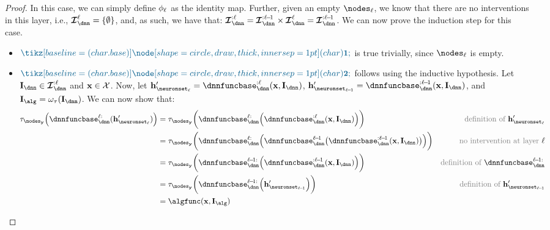 \begin{proof}
    In this case, we can simply define $\phi_\ell$ as the identity map.
    Further, given an empty $\nodes_\layer$, we know that there are no interventions in this layer, i.e., $\interventionsset^{\layer}_{\dnn} = \{\emptyintervention\}$, and, as such, we have that:
    $\interventionsset^{:\layer}_{\dnn} = \interventionsset^{:\layer\!-\!1}_{\dnn} \times \interventionsset^{\layer}_{\dnn} = \interventionsset^{:\layer\!-\!1}_{\dnn}$.
    We can now prove the induction step for this case.
    \begin{itemize}
        \item $\inductioncircle{1}$ is true trivially, since  $\nodes_\layer$ is empty.
        \item $\inductioncircle{2}$ follows using the inductive hypothesis. 
        Let $\interventionsdnn \in \interventionsset^{:\layer}_{\dnn}$ and $\mathbf{x} \in \mathcal{X}$.
        Now, let $\hiddenstates'_{\neuronset_{\layer}} = \dnnfunclayer{:\layer}(\bx, \interventionsdnn)$, $\hiddenstates'_{\neuronset_{\layer\!-\!1}} = \dnnfunclayer{:\layer\!-\!1}(\bx, \interventionsdnn)$, and $\interventionsalg = \interventionmap(\interventionsdnn)$.
        We can now show that:
        \begin{subequations}
            \begin{align}
                \abstractionmap_{\nodesoutput}\Big(\dnnfunclayer{\layer:}(\hiddenstates'_{\neuronset_{\layer}})\Big) 
                &= \abstractionmap_{\nodesoutput}\bigg(\dnnfunclayer{\layer:}\Big(\dnnfunclayer{:\layer}(\bx, \interventionsdnn)\Big)\bigg) 
                & \mathcomment{definition of }\hiddenstates'_{\neuronset_{\layer}} \\
                &= \abstractionmap_{\nodesoutput}\bigg(\dnnfunclayer{\layer:}\Big(\dnnfunclayer{\layer\!-\!1}\big(\dnnfunclayer{:\layer\!-\!1}(\bx, \interventionsdnn)\big)\Big)\bigg) 
                & \mathcomment{no intervention at layer }\layer \\
                &= \abstractionmap_{\nodesoutput}\bigg(\dnnfunclayer{\layer\!-\!1:}\Big(\dnnfunclayer{:\layer\!-\!1}(\bx, \interventionsdnn)\Big)\bigg)
                & \mathcomment{definition of }\dnnfunclayer{\layer\!-\!1:} \\
                &= \abstractionmap_{\nodesoutput}\bigg(\dnnfunclayer{\layer\!-\!1:}\Big(\hiddenstates'_{\neuronset_{\layer\!-\!1}}\Big)\bigg)
                & \mathcomment{definition of }\hiddenstates'_{\neuronset_{\layer\!-\!1}} \\
                &= \algfunc(\bx, \interventionsalg)

\end{align}
\end{subequations}
\end{itemize}
\end{proof}
